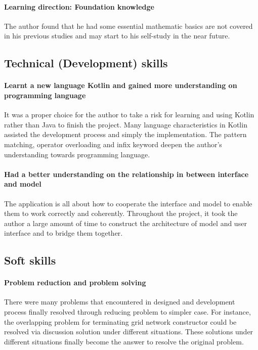 \paragraph{Learning direction: Foundation knowledge}
The author found that he had some essential mathematic basics are not covered in his previous studies and
may start to his self-study in the near future.

\subsection{Technical (Development) skills}

\paragraph{Learnt a new language Kotlin and gained more understanding on programming language}
It was a proper choice for the author to take a risk for learning and using Kotlin rather than Java to finish
the project. Many language characteristics in Kotlin assisted the development process and simply the
implementation. The pattern matching, operator overloading and infix keyword deepen the author's understanding
towards programming language.

\paragraph{Had a better understanding on the relationship in between interface and model}
The application is all about how to cooperate the interface and model to enable them to work correctly and coherently.
Throughout the project, it took the author a large amount of time to construct the architecture of model and
user interface and to bridge them together.


\subsection{Soft skills}
\paragraph{Problem reduction and problem solving}
There were many problems that encountered in designed and development process finally
resolved through reducing problem to simpler case. For instance, the overlapping problem
for terminating grid network constructor could be resolved via discussion solution under
different situations. These solutions under different situations finally become the answer
to resolve the original problem.

